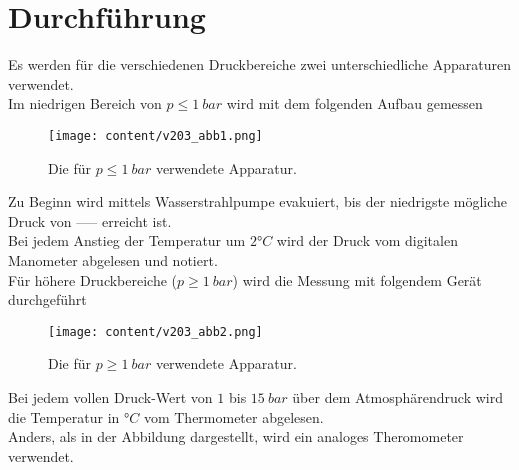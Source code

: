 \section{Durchführung}
\label{sec:Durchführung}

Es werden für die verschiedenen Druckbereiche zwei unterschiedliche Apparaturen verwendet. \\
Im niedrigen Bereich von $p \leqslant 1\:bar$ wird mit dem folgenden Aufbau gemessen

\begin{figure}[H]
    \centering
    \texttt{[image: content/v203\_abb1.png]}
    \caption{Die für $p \leqslant 1\:bar$ verwendete Apparatur. \cite{sample}}
    \label{abb:niedrigdruck}
\end{figure}
Zu Beginn wird mittels Wasserstrahlpumpe evakuiert, bis der niedrigste mögliche Druck von ----- erreicht ist.\\ %

Bei jedem Anstieg der Temperatur um $2°C$ wird der Druck vom digitalen Manometer abgelesen und notiert.\\


Für höhere Druckbereiche ($p \geqslant 1\:bar$) wird die Messung mit folgendem Gerät durchgeführt

\begin{figure}[H]
    \centering
    \texttt{[image: content/v203\_abb2.png]}
    \caption{Die für $p \geqslant 1\:bar$ verwendete Apparatur. \cite{sample}}
    \label{abb:hoherdruck}
\end{figure}

Bei jedem vollen Druck-Wert von $1$ bis $15\:bar$ über dem Atmosphärendruck wird die Temperatur in $°C$ vom Thermometer abgelesen.\\
Anders, als in der Abbildung dargestellt, wird ein analoges Theromometer verwendet.\\